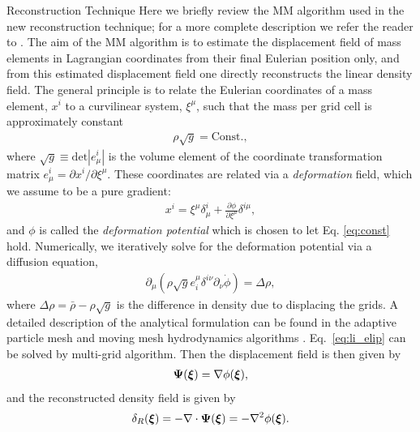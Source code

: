 \begin{section}{Reconstruction Technique}
  \label{sec:reconstruction}
  Here we briefly review the MM algorithm used in the new reconstruction technique; for a more
  complete description we refer the reader to \cite{bib:ZhuH2016}.  
  The aim of the MM algorithm is to estimate the displacement field of mass elements in 
  Lagrangian coordinates from their final Eulerian position only, and from this
  estimated displacement field one directly reconstructs the linear density field. The
  general principle is to relate the Eulerian coordinates of a mass element, $x^i$ to
  a curvilinear system, $\xi^\mu$, such that the mass
  per grid cell is approximately constant
  \begin{align}
   \label{eq:const}
    \rho \sqrt{g}=\mathrm{Const.},
  \end{align}
  where $\sqrt{g} \equiv \mathrm{det}\left| e^i_\mu\right|$ is the volume
  element of the coordinate transformation matrix $e^i_\mu = \partial x^i / \partial \xi ^ \mu$. 
  These coordinates are
  related via a {\it deformation} field, which we assume to be a pure
  gradient:
  \begin{align}
    x^i = \xi^\mu \delta^i_\mu + \frac{\partial \phi}{\partial
    \xi^\mu}\delta^{i\mu},
  \end{align}
  and $\phi$ is called the {\it deformation potential} which is chosen to let Eq. \ref{eq:const} hold.  
  Numerically, we iteratively solve for
  the deformation potential via a diffusion equation, 
  \begin{align}
    \label{eq:li_elip}
    \partial _\mu (\rho \sqrt{g} e^\mu _i \delta^{i\nu}
    \partial_\nu \dot{\phi})=\Delta \rho,
  \end{align}
  where $\Delta \rho = \bar{\rho}-\rho \sqrt{g}$ is the difference in density 
  due to displacing the grids. A detailed description 
  of the analytical formulation can be found in the adaptive
  particle mesh and moving mesh hydrodynamics algorithms \cite{bib:Pen1995,bib:Pen1998}.
  Eq.~\ref{eq:li_elip} can be solved by multi-grid
  algorithm\cite{bib:Pen1995,bib:Pen1998,bib:ZhuH2016}.
  Then the displacement field is then given by
  \begin{align}
   \label{eq:disp}
   \boldsymbol{\Psi}(\boldsymbol{\xi})=\nabla \phi(\boldsymbol{\xi}),
  \end{align}
  and the reconstructed density field is given by
  \begin{align}
   \label{eq:delta}
   \delta_R(\boldsymbol{\xi})=- \nabla \cdot \boldsymbol{\Psi}(\boldsymbol{\xi}) = - \nabla^2 \phi(\boldsymbol{\xi}). 
  \end{align}

\end{section}

